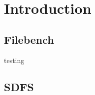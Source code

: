 \chapter{Introduction}\label{chap:intro}

\section{Filebench}

testing\cite{Simpson}

\section{SDFS}

